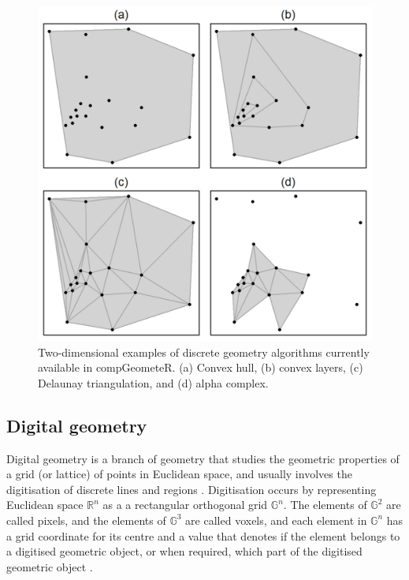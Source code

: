 \documentclass[12pt, a4paper]{article}
\begin{document}
\begin{figure}[ht]
\centering
\includegraphics{figures/figure-1/figure-1.png}
\caption{Two-dimensional examples of discrete geometry algorithms currently available in compGeometeR. (a) Convex hull, (b) convex layers, (c) Delaunay triangulation, and (d) alpha complex.}
\label{fig:euclidean-algorithms}
\end{figure}


\subsection{Digital geometry}

Digital geometry is a branch of geometry that studies the geometric properties of a grid (or lattice) of points in Euclidean space, and usually involves the digitisation of discrete lines and regions \citep{rosenfeld-1989}.  Digitisation occurs by representing Euclidean space $\mathbb{R}^n$ as a a rectangular orthogonal grid $\mathbb{G}^n$.  The elements of $\mathbb{G}^2$ are called pixels, and the elements of $\mathbb{G}^3$ are called voxels, and each element in $\mathbb{G}^n$ has a grid coordinate for its centre \citep{klette-2004} and a value that denotes if the element belongs to a digitised geometric object, or when required, which part of the digitised geometric object .
\end{document}
